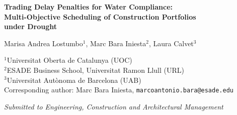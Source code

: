 \documentclass[12pt,a4paper]{article}
\begin{document}
\begin{titlepage}
\centering
\vspace*{2cm}
{\LARGE\bfseries Trading Delay Penalties for Water Compliance:\\
Multi-Objective Scheduling of Construction Portfolios\\
under Drought\par}
\vspace{1.5cm}
{\large
Marisa Andrea Lostumbo$^{1}$,\quad
Marc Bara Iniesta$^{2}$,\quad
Laura Calvet$^{3}$
\par}
\vspace{0.8cm}
{\normalsize
$^{1}$Universitat Oberta de Catalunya (UOC)\\
$^{2}$ESADE Business School, Universitat Ramon Llull (URL)\\
$^{3}$Universitat Aut\`{o}noma de Barcelona (UAB)\\[0.4cm]
Corresponding author: Marc Bara Iniesta, \texttt{marcoantonio.bara@esade.edu}
\par}
\vspace{1cm}
{\small\textit{Submitted to Engineering, Construction and Architectural Management}}
\vfill
\end{titlepage}
\end{document}
